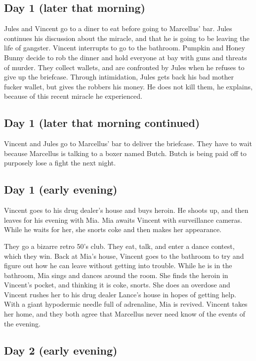 \documentclass[a4paper,12pt]{article}
\begin{document}
\subsection*{Day 1 (later that morning)}

Jules and Vincent go to a diner to eat before going to Marcellus' bar. Jules
continues his discussion about the miracle, and that he is going to be leaving
the life of gangster. Vincent interrupts to go to the bathroom. Pumpkin and Honey
Bunny decide to rob the dinner and hold everyone at bay with guns and threats of
murder. They collect wallets, and are confronted by Jules when he refuses to give
up the briefcase. Through intimidation, Jules gets back his bad mother fucker wallet,
but gives the robbers his money. He does not kill them, he explains, because of
this recent miracle he experienced.

\subsection*{Day 1 (later that morning continued)}

Vincent and Jules go to Marcellus' bar to deliver the briefcase. They have to wait
because Marcellus is talking to a boxer named Butch. Butch is being paid off to
purposely lose a fight the next night.

\subsection*{Day 1 (early evening)}

Vincent goes to his drug dealer's house and buys heroin. He shoots up, and then
leaves for his evening with Mia. Mia awaits Vincent with surveillance cameras.
While he waits for her, she snorts coke and then makes her appearance.

They go a bizarre retro 50's club. They eat, talk, and enter a dance contest,
which they win. Back at Mia's house, Vincent goes to the bathroom to try and figure
out how he can leave without getting into trouble. While he is in the bathroom,
Mia sings and dances around the room. She finds the heroin in Vincent's pocket,
and thinking it is coke, snorts. She does an overdose and Vincent rushes her to
his drug dealer Lance's house in hopes of getting help. With a giant hypodermic
needle full of adrenaline, Mia is revived. Vincent takes her home, and they both
agree that Marcellus never need know of the events of the evening.

\subsection*{Day 2 (early evening)}
\end{document}
